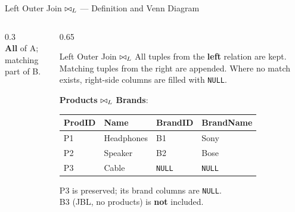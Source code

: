 \begin{frame}{Left Outer Join $\bowtie_L$ --- Definition and Venn Diagram}
  \begin{columns}[c]
    \begin{column}{0.3\textwidth}
      \centering
      \\[4pt]
      \small \textbf{All} of A; matching part of B.
    \end{column}
    \begin{column}{0.65\textwidth}
      \begin{block}{Left Outer Join $\bowtie_L$}
        All tuples from the \textbf{left} relation are kept.  Matching tuples
        from the right are appended.  Where no match exists, right-side columns
        are filled with \texttt{NULL}.
      \end{block}

      \vspace{4pt}
      \small
      \textbf{Products} $\bowtie_L$ \textbf{Brands}:

      \begin{tabular}{llll}
        \toprule
        ProdID & Name & BrandID & BrandName\\
        \midrule
        P1 & Headphones & B1 & Sony \\
        P2 & Speaker    & B2 & Bose \\
        P3 & Cable      & \texttt{NULL} & \texttt{NULL} \\
        \bottomrule
      \end{tabular}

      \vspace{4pt}
      P3 is preserved; its brand columns are \texttt{NULL}.\\
      B3 (JBL, no products) is \textbf{not} included.
    \end{column}
  \end{columns}
\end{frame}

